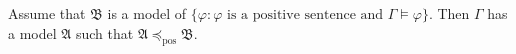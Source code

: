 Assume that $\mathfrak{B}$ is a model of $\{\varphi : \varphi \text{ is a positive sentence and } \Gamma \models \varphi\}$. Then $\Gamma$ has a model $\mathfrak{A}$ such that $\mathfrak{A} \preceq_{\mathrm{pos}} \mathfrak{B}$.
